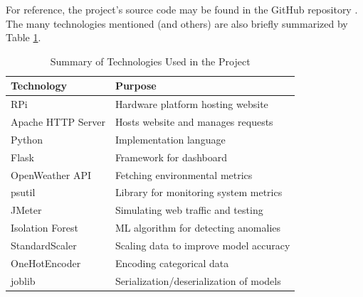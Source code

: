 \documentclass[conference]{IEEEtran}
\begin{document}
For reference, the project's source code may be found in the GitHub repository \cite{arthur_github}. The many technologies mentioned (and others) are also briefly summarized by Table \ref{tab:technologies}.

\begin{table}[ht]
    \centering
    \caption{Summary of Technologies Used in the Project}
    \label{tab:technologies}
    \small
    \begin{tabular}{ll}
        \toprule
        \textbf{Technology} & \textbf{Purpose}                        \\
        \midrule
        RPi                 & Hardware platform hosting website       \\
        Apache HTTP Server  & Hosts website and manages requests      \\
        Python              & Implementation language                 \\
        Flask               & Framework for dashboard                 \\
        OpenWeather API     & Fetching environmental metrics          \\
        psutil              & Library for monitoring system metrics   \\
        JMeter              & Simulating web traffic and testing      \\
        Isolation Forest    & ML algorithm for detecting anomalies    \\
        StandardScaler      & Scaling data to improve model accuracy  \\
        OneHotEncoder       & Encoding categorical data               \\
        joblib              & Serialization/deserialization of models \\
        \bottomrule
    \end{tabular}
\end{table}
\end{document}
